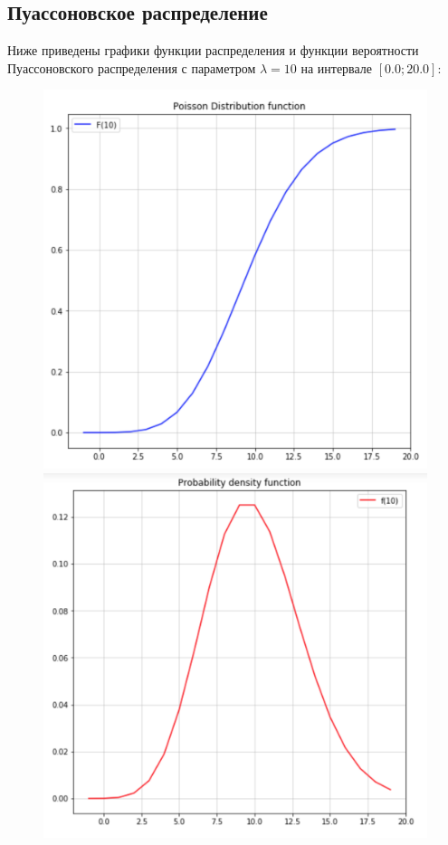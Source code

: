 \documentclass[a4paper,12pt]{article}
\begin{document}
	\newpage

	\subsection*{Пуассоновское распределение}
	
	Ниже приведены графики функции распределения и функции вероятности Пуассоновского распределения с параметром $\lambda = 10$ на интервале $[0.0; 20.0]$:
	
	\begin{figure}[h!]
		\begin{minipage}[b]{0.5\textwidth}
			\includegraphics[width=\textwidth]{examples/F_puass.png}
		\end{minipage}
		\begin{minipage}[b]{0.5\textwidth}
			\includegraphics[width=\textwidth]{examples/p_puass.png}

\end{minipage}
\end{figure}
\end{document}
